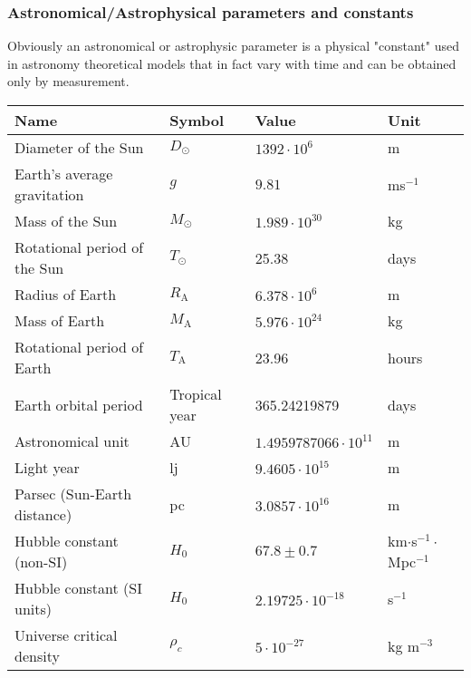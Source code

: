 	\subsubsection{Astronomical/Astrophysical parameters and constants}
	Obviously an astronomical or astrophysic parameter is a physical "constant" used in astronomy theoretical models that in fact vary with time and can be obtained only by measurement.
	\begin{center}
	\begin{tabular}{||l|lll||}
	\hline
	{\textbf{Name}}&{\textbf{Symbol}}&{\textbf{Value}}&{\textbf{Unit}}\\
	\hline
	\hline
	Diameter of the Sun          &$D_\odot$&$1392\cdot10^6$&m\rule{0pt}{13pt}\\
	Earth's average gravitation	 &$g$&$9.81$&ms$^{-1}$\rule{0pt}{13pt}\\
	Mass of the Sun              &$M_\odot$&$1.989\cdot10^{30}$&kg\\
	Rotational period of the Sun &$T_\odot$&25.38&days\\
	Radius of Earth              &$R_{\text{A}}$&$6.378\cdot10^6$&m\\
	Mass of Earth                &$M_{\text{A}}$&$5.976\cdot10^{24}$&kg\\
	Rotational period of Earth   &$T_{\text{A}}$&23.96&hours\\
	Earth orbital period         &Tropical year&365.24219879&days\\
	Astronomical unit            &AU&$1.4959787066\cdot10^{11}$&m\\
	Light year                   &lj&$9.4605\cdot10^{15}$&m\\
	Parsec (Sun-Earth distance)                      &pc&$3.0857\cdot10^{16}$&m\\
	Hubble constant (non-SI)     &$H_0$&$67.8\pm0.7$&km$\cdot$s$^{-1}\cdot$Mpc$^{-1}$\\
	Hubble constant (SI units)  &$H_0$&$2.19725\cdot 10^{-18}$&s$^{-1}$\\
	Universe critical density	&$\rho_c$&$5\cdot 10^{-27}$&kg m$^{-3}$\\
	\hline
	\end{tabular}
	\end{center}
